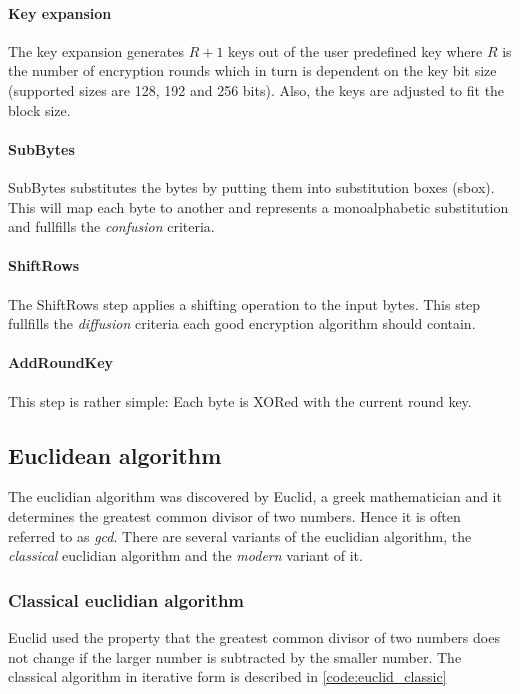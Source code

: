 \paragraph{Key expansion}
The key expansion generates $R + 1$ keys out of the user predefined key where
$R$ is the number of encryption rounds which in turn is dependent on the key 
bit size (supported sizes are 128, 192 and 256 bits). Also,
the keys are adjusted to fit the block size.

\paragraph{SubBytes}
SubBytes substitutes the bytes by putting them into substitution boxes (sbox).
This will map each byte to another and represents a monoalphabetic substitution
and fullfills the \textit{confusion} criteria.

\paragraph{ShiftRows}
The ShiftRows step applies a shifting operation to the input bytes. This step
fullfills the \textit{diffusion} criteria each good encryption algorithm should
contain.

\paragraph{AddRoundKey}
This step is rather simple: Each byte is XORed with the current round key.

\subsection{Euclidean algorithm}

The euclidian algorithm was discovered by Euclid, a greek mathematician and it
determines the greatest common divisor of two numbers.
Hence it is often referred to as \textit{gcd}. There are several variants
of the euclidian algorithm, the \textit{classical} euclidian algorithm and the
\textit{modern} variant of it.

\subsubsection{Classical euclidian algorithm}

Euclid used the property that the greatest common divisor of two numbers does
not change if the larger number is subtracted by the smaller number. The classical
algorithm in iterative form is described in \ref{code:euclid_classic}

